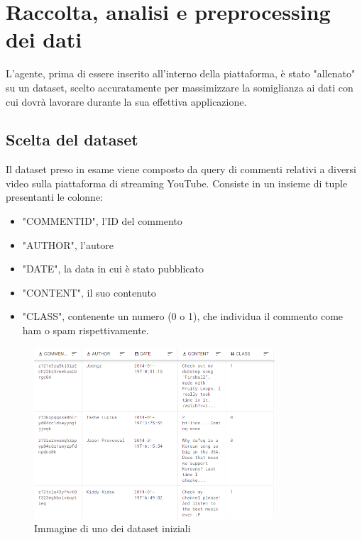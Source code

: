 \documentclass{report}
\begin{document}
    

                        


   
    \chapter{Raccolta, analisi e preprocessing dei dati}
    L'agente, prima di essere inserito all'interno della piattaforma, è stato "allenato" su un dataset, scelto accuratamente per massimizzare la somiglianza ai dati con cui dovrà lavorare 
    durante la sua effettiva applicazione. 
    \section{Scelta del dataset}
    Il dataset preso in esame viene composto da query di commenti relativi a diversi video sulla piattaforma di streaming YouTube. 
    Consiste in un insieme di tuple presentanti le colonne:
    \begin{itemize}

        \item "COMMENT\textunderscore ID", l'ID del commento

        \item "AUTHOR", l'autore
        \item "DATE", la data in cui è stato pubblicato
        \item "CONTENT", il suo contenuto
        \item "CLASS", contenente un numero (0 o 1), che individua il commento come ham o spam rispettivamente.
    \end{itemize}

    
    \begin{figure}[h]

        \centering
        \includegraphics[width = 0.8\textwidth]{immagini/datasetExample.png}
        \caption{Immagine di uno dei dataset iniziali}

    \end{figure}
\end{document}
